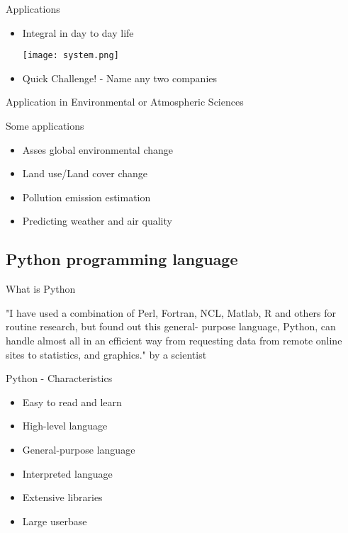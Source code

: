 \begin{frame}{Applications}
	\begin{beamerboxesrounded}{}
		\begin{itemize}
			\item Integral in day to day life
			
			{\centering
			\texttt{[image: system.png]} }
			
			\item Quick Challenge! - Name any two companies 
		\end{itemize}
	\end{beamerboxesrounded}
\end{frame}


\begin{frame}{Application in Environmental or Atmospheric Sciences}
	\begin{beamerboxesrounded}{Some applications}
		\begin{itemize}
			\item Asses global environmental change
			\item Land use/Land cover change  
			\item Pollution emission estimation
			\item Predicting weather and air quality
		\end{itemize}
	\end{beamerboxesrounded}
\end{frame}

\subsection[Python programming language]{Python programming language}

\begin{frame}{What is Python}
	\begin{beamerboxesrounded}{}
		"I have used a combination of Perl, Fortran, NCL, Matlab, R and others for routine research, but found out this general- purpose language, Python, can handle almost all in an efficient way from requesting data from remote online sites to statistics, and graphics."
		by a scientist
	\end{beamerboxesrounded}
\end{frame}

\begin{frame}{Python - Characteristics}
	\begin{beamerboxesrounded}{}
		\begin{itemize}
			\item Easy to read and learn
			\item High-level language
			\item General-purpose language
			\item Interpreted language
			\item Extensive libraries
			\item Large userbase 
		\end{itemize}
	\end{beamerboxesrounded}
\end{frame}

